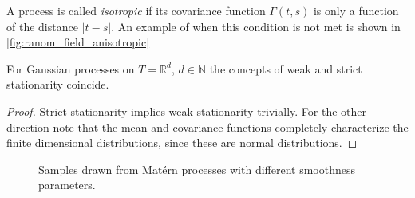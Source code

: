 A process is called \textit{isotropic} if its covariance function \( \Gamma(t,s) \) is only a function of the distance \( \lvert t-s \rvert \). An example of when this condition is not met is shown in \cref{fig:ranom_field_anisotropic}

\begin{theorem}
    For Gaussian processes on \( T = \mathbb{R}^{d} \), $d \in \mathbb{N}$ the concepts of weak and strict stationarity coincide.
\end{theorem}

\begin{proof}
    Strict stationarity implies weak stationarity trivially.
    For the other direction note that the mean and covariance functions completely characterize the finite dimensional distributions, since these are normal distributions.
\end{proof}
\begin{figure}[b]
    \centering
    
    
    
    \caption{Samples drawn from Matérn processes with different smoothness parameters.}
    \label{fig:samples_matern_gaussian_kernel}
\end{figure}




